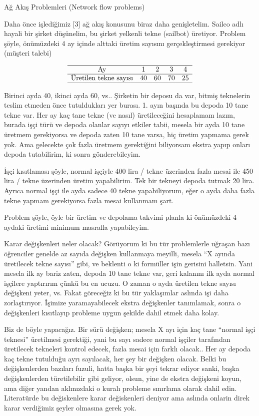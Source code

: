 \documentclass[12pt,fleqn]{article}\usepackage{../../common}
\begin{document}
Ağ Akış Problemleri (Network flow problems)

Daha önce işlediğimiz [3] ağ akış konusunu biraz daha genişletelim. Sailco
adlı hayali bir şirket düşünelim, bu şirket yelkenli tekne (sailbot)
üretiyor. Problem şöyle, önümüzdeki 4 ay içinde alttaki üretim sayısını
gerçekleştirmesi gerekiyor (müşteri talebi)

$$ 
\begin{array}{ccccc}
\hline
\textrm{Ay} & 1 & 2 & 3 & 4 \\
\hline
\textrm{Üretilen tekne sayısı} & 40 & 60 & 70 & 25 \\
\hline
\end{array}
$$

Birinci ayda 40, ikinci ayda 60, vs.. Şirketin bir deposu da var, bitmiş
teknelerin teslim etmeden önce tutuldukları yer burası. 1. ayın başında bu
depoda 10 tane tekne var. Her ay kaç tane tekne (ve nasıl) üretileceğini
hesaplamam lazım, burada işçi türü ve depoda olanlar sayıyı etkiler tabii,
mesela bir ayda 10 tane üretmem gerekiyorsa ve depoda zaten 10 tane varsa,
hiç üretim yapmama gerek yok. Ama gelecekte çok fazla üretmem gerektiğini
biliyorsam ekstra yapıp onları depoda tutabilirim, ki sonra gönderebileyim.

İşçi kısıtlaması şöyle, normal işçiyle 400 lira / tekne üzerinden fazla
mesai ile 450 lira / tekne üzerinden üretim yapabilirim. Tek bir tekneyi
depoda tutmak 20 lira. Ayrıca normal işçi ile ayda sadece 40 tekne
yapabiliyorum, eğer o ayda daha fazla tekne yapmam gerekiyorsa fazla mesai
kullanmam şart.

Problem şöyle, öyle bir üretim ve depolama takvimi planla ki önümüzdeki 4
aydaki üretimi minimum masrafla yapabileyim. 

Karar değişkenleri neler olacak? Görüyorum ki bu tür problemlerle uğraşan
bazı öğrenciler genelde az sayıda değişken kullanmaya meyilli, mesela ``X
ayında üretilecek tekne sayısı'' gibi, ve beklenti o ki formüller işin
gerisini halletsin. Yani mesela ilk ay bariz zaten, depoda 10 tane tekne
var, geri kalanını ilk ayda normal işçilere yaptırırım çünkü bu en ucuzu. O
zaman o ayda üretilen tekne sayısı değişkeni yeter, vs. Fakat göreceğiz ki
bu tür yaklaşımlar aslında işi daha zorlaştırıyor. İşimize yaramayabilecek
ekstra değişkenler tanımlamak, sonra o değişkenleri kısıtlayıp probleme
uygun şekilde dahil etmek daha kolay.

Biz de böyle yapacağız. Bir sürü değişken; mesela X ayı için kaç tane
``normal işçi teknesi'' üretilmesi gerektiği, yani bu sayı sadece normal
işçiler tarafından üretilecek tekneleri kontrol edecek, fazla mesai için
farklı olacak.. Her ay depoda kaç tekne tutulduğu ayrı sayılacak, her şey
bir değişken olacak. Belki bu değişkenlerden bazıları fuzuli, hatta başka
bir şeyi tekrar ediyor sanki, başka değişkenlerden türetilebilir gibi
geliyor, olsun, yine de ekstra değişkeni koyun, ama diğer yandan
aklınızdaki o kuralı probleme sınırlama olarak dahil edin. Literatürde bu
değiskenlere karar değiskenleri deniyor ama aslında onlarin direk karar
verdiğimiz şeyler olmasına gerek yok.
\end{document}

